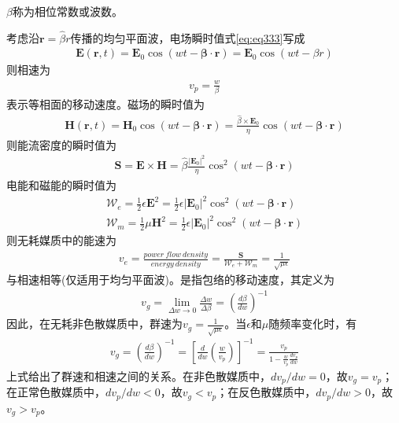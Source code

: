 \documentclass{article}
\numberwithin{equation}{section}
\renewcommand{\vec}[1]{\boldsymbol{#1}}
\begin{document}
$\beta$称为相位常数或波数。\par
考虑沿$\vec{r}=\hat{\beta}r$传播的均匀平面波，电场瞬时值式\ref{eq:eq333}写成
\begin{align}
    \label{eq:eq343}
    \mathcal{\vec{E}}(\vec{r},t)=\mathbf{E}_0\cos(wt-\vec{\beta}\cdot\vec{r})=\mathbf{E}_0\cos(wt-\beta r)
\end{align}
则相速为
\begin{align}
    \label{eq:eq344}
    v_p=\frac{w}{\beta}
\end{align}
表示等相面的移动速度。磁场的瞬时值为
\begin{align}
    \label{eq:eq345}
    \mathcal{\vec{H}}(\vec{r},t)=\mathbf{H}_0\cos(wt-\vec{\beta}\cdot\vec{r})=\frac{\hat{\beta}\times\mathbf{E}_0}{\eta}\cos(wt-\vec{\beta}\cdot\vec{r})
\end{align}
则能流密度的瞬时值为
\begin{align}
    \label{eq:eq346}
    \mathcal{\vec{S}}=\mathcal{\vec{E}}\times\mathcal{\vec{H}}=\hat{\beta}\frac{|\mathbf{E}_0|^2}{\eta}\cos^2(wt-\vec{\beta}\cdot\vec{r})
\end{align}
电能和磁能的瞬时值为
\begin{align}
    \label{eq:eq347}
    \mathcal{W}_e=\frac{1}{2}\epsilon\mathcal{\vec{E}}^2=\frac{1}{2}\epsilon|\mathbf{E}_0|^2\cos^2(wt-\vec{\beta}\cdot\vec{r}) \\
    \label{eq:eq348}
    \mathcal{W}_m=\frac{1}{2}\mu\mathcal{\vec{H}}^2=\frac{1}{2}\epsilon|\mathbf{E}_0|^2\cos^2(wt-\vec{\beta}\cdot\vec{r})
\end{align}
则无耗媒质中的能速为
\begin{align}
    \label{eq:eq349}
    v_e=\frac{power~flow~density}{energy~density}=\frac{\mathbf{S}}{\mathcal{W}_e+\mathcal{W}_m}=\frac{1}{\sqrt{\mu\epsilon}}
\end{align}
与相速相等(仅适用于均匀平面波)。\textbf{\color{blue}{群速}}是指包络的移动速度，其定义为
\begin{align}
    \label{eq:eq350}
    v_g=\lim_{\Delta w\to 0}\frac{\Delta w}{\Delta \beta}=\left(\frac{d\beta}{dw}\right)^{-1}
\end{align}
因此，在无耗非色散媒质中，群速为$v_g=\frac{1}{\sqrt{\mu\epsilon}}$。当$\epsilon$和$\mu$随频率变化时，有
\begin{align}
    \label{eq:eq351}
    v_g=\left(\frac{d\beta}{dw}\right)^{-1}=\left[\frac{d}{dw}\left(\frac{w}{v_p}\right)\right]^{-1}=\frac{v_p}{1-\frac{w}{v_p}\frac{dv_p}{dw}}
\end{align}
上式给出了群速和相速之间的关系。在非色散媒质中，$dv_p/dw=0$，故$v_g=v_p$；在正常色散媒质中，$dv_p/dw<0$，故$v_g<v_p$；在反色散媒质中，$dv_p/dw>0$，故$v_g>v_p$。\par
\end{document}
